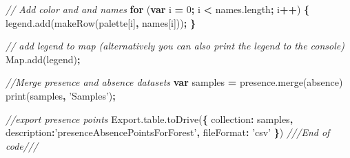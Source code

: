 \documentclass[]{article}
\newenvironment{Shaded}{\begin{snugshade}}{\end{snugshade}}
\newcommand{\KeywordTok}[1]{\textcolor[rgb]{0.13,0.29,0.53}{\textbf{#1}}}
\newcommand{\DataTypeTok}[1]{\textcolor[rgb]{0.13,0.29,0.53}{#1}}
\newcommand{\DecValTok}[1]{\textcolor[rgb]{0.00,0.00,0.81}{#1}}
\newcommand{\StringTok}[1]{\textcolor[rgb]{0.31,0.60,0.02}{#1}}
\newcommand{\CommentTok}[1]{\textcolor[rgb]{0.56,0.35,0.01}{\textit{#1}}}
\newcommand{\VariableTok}[1]{\textcolor[rgb]{0.00,0.00,0.00}{#1}}
\newcommand{\ControlFlowTok}[1]{\textcolor[rgb]{0.13,0.29,0.53}{\textbf{#1}}}
\newcommand{\OperatorTok}[1]{\textcolor[rgb]{0.81,0.36,0.00}{\textbf{#1}}}
\newcommand{\AttributeTok}[1]{\textcolor[rgb]{0.77,0.63,0.00}{#1}}
\newcommand{\NormalTok}[1]{#1}
\begin{document}
\begin{Shaded}
\begin{Highlighting}[]
\CommentTok{// Add color and and names}
\ControlFlowTok{for}\NormalTok{ (}\KeywordTok{var}\NormalTok{ i }\OperatorTok{=} \DecValTok{0}\OperatorTok{;}\NormalTok{ i }\OperatorTok{<} \VariableTok{names}\NormalTok{.}\AttributeTok{length}\OperatorTok{;}\NormalTok{ i}\OperatorTok{++}\NormalTok{) }\OperatorTok{\{}
  \VariableTok{legend}\NormalTok{.}\AttributeTok{add}\NormalTok{(}\AttributeTok{makeRow}\NormalTok{(palette[i]}\OperatorTok{,}\NormalTok{ names[i]))}\OperatorTok{;}
  \OperatorTok{\}}  

\CommentTok{// add legend to map (alternatively you can also print the legend to the console)  }
\VariableTok{Map}\NormalTok{.}\AttributeTok{add}\NormalTok{(legend)}\OperatorTok{;}  

\CommentTok{//Merge presence and absence datasets}
\KeywordTok{var}\NormalTok{ samples }\OperatorTok{=} \VariableTok{presence}\NormalTok{.}\AttributeTok{merge}\NormalTok{(absence)}
\AttributeTok{print}\NormalTok{(samples}\OperatorTok{,} \StringTok{'Samples'}\NormalTok{)}\OperatorTok{;}

\CommentTok{//export presence points}
\VariableTok{Export}\NormalTok{.}\VariableTok{table}\NormalTok{.}\AttributeTok{toDrive}\NormalTok{(}\OperatorTok{\{}
  \DataTypeTok{collection}\OperatorTok{:}\NormalTok{ samples}\OperatorTok{,}
  \DataTypeTok{description}\OperatorTok{:}\StringTok{'presenceAbsencePointsForForest'}\OperatorTok{,}
  \DataTypeTok{fileFormat}\OperatorTok{:} \StringTok{'csv'}
\OperatorTok{\}}\NormalTok{)}
\CommentTok{///End of code///}
\end{Highlighting}
\end{Shaded}
\end{document}

